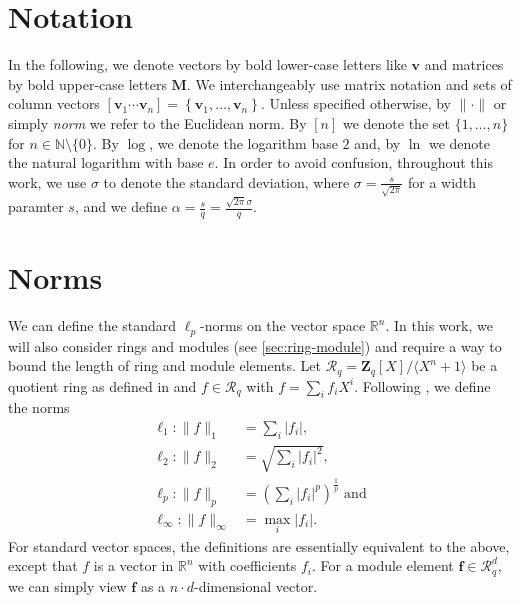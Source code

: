 


\section{Notation}
In the following, we denote vectors by bold lower-case letters like $\mathbf{v}$ and matrices by bold upper-case letters $\mathbf{M}$. We interchangeably use matrix notation and sets of column vectors $\left[\mathbf{v}_1 \cdots \mathbf{v}_n\right] = \left\{\mathbf{v}_1, \dots, \mathbf{v}_n\right\}$. Unless specified otherwise, by $\| \cdot \|$ or simply \textit{norm} we refer to the Euclidean norm. By $[n]$ we denote the set $\{1, \dots, n\}$ for $n\in \mathbb{N} \setminus \{0\}$. By $\log$, we denote the logarithm base $2$ and, by $\ln$ we denote the natural logarithm with base $e$. In order to avoid confusion, throughout this work, we use $\sigma$ to denote the standard deviation, where $\sigma = \frac{s}{\sqrt{2 \pi}}$ for a width paramter $s$, and we define $\alpha = \frac{s}{q} = \frac{\sqrt{2\pi} \sigma}{q}$.

\section{Norms}\label{sec:norms}
We can define the standard $\ell_p$-norms on the vector space $\mathbb{R}^n$. In this work, we will also consider rings and modules (see \cref{sec:ring-module}) and require a way to bound the length of ring and module elements. Let $\mathcal{R}_q=\mathbf{Z}_q[X]/\langle X^n + 1 \rangle$ be a quotient ring as defined in \cite{BDLOP18} and $f \in \mathcal{R}_q$ with $f = \sum_i f_i X^i$. Following \cite{BDLOP18}, we define the norms
\begin{equation}
    \begin{aligned}
        \ell_1 : \| f \|_1           & = \sum_i |f_i|,                                         \\
        \ell_2 : \| f \|_2           & = \sqrt{\sum_i |f_i|^2},                                \\
        \ell_p : \| f \|_p           & = \left(\sum_i |f_i|^p\right)^{\frac{1}{p}} \text{ and} \\
        \ell_\infty : \| f \|_\infty & = \max_i |f_i|.
    \end{aligned}
\end{equation}
For standard vector spaces, the definitions are essentially equivalent to the above, except that $f$ is a vector in $\mathbb{R}^n$ with coefficients $f_i$. For a module element $\mathbf{f} \in \mathcal{R}_q^d$, we can simply view $\mathbf{f}$ as a $n\cdot d$-dimensional vector.

